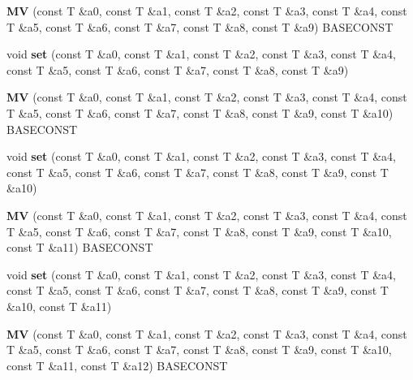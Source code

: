 \begin{DoxyCompactItemize}
\item 
\hypertarget{classvsr_1_1_m_v_a33e1f0de34216066d90ba01eb4285ca2}{{\bfseries M\-V} (const T \&a0, const T \&a1, const T \&a2, const T \&a3, const T \&a4, const T \&a5, const T \&a6, const T \&a7, const T \&a8, const T \&a9) B\-A\-S\-E\-C\-O\-N\-S\-T}\label{classvsr_1_1_m_v_a33e1f0de34216066d90ba01eb4285ca2}

\item 
\hypertarget{classvsr_1_1_m_v_a4fd8f142a49e1610870d72131c5ae9ea}{void {\bfseries set} (const T \&a0, const T \&a1, const T \&a2, const T \&a3, const T \&a4, const T \&a5, const T \&a6, const T \&a7, const T \&a8, const T \&a9)}\label{classvsr_1_1_m_v_a4fd8f142a49e1610870d72131c5ae9ea}

\item 
\hypertarget{classvsr_1_1_m_v_a354ea82b09fb50715220e42b528440f9}{{\bfseries M\-V} (const T \&a0, const T \&a1, const T \&a2, const T \&a3, const T \&a4, const T \&a5, const T \&a6, const T \&a7, const T \&a8, const T \&a9, const T \&a10) B\-A\-S\-E\-C\-O\-N\-S\-T}\label{classvsr_1_1_m_v_a354ea82b09fb50715220e42b528440f9}

\item 
\hypertarget{classvsr_1_1_m_v_a1528c747339690b289dcb4c040e80956}{void {\bfseries set} (const T \&a0, const T \&a1, const T \&a2, const T \&a3, const T \&a4, const T \&a5, const T \&a6, const T \&a7, const T \&a8, const T \&a9, const T \&a10)}\label{classvsr_1_1_m_v_a1528c747339690b289dcb4c040e80956}

\item 
\hypertarget{classvsr_1_1_m_v_a51d7eb5f026fa176c0b6cd35a2a185c9}{{\bfseries M\-V} (const T \&a0, const T \&a1, const T \&a2, const T \&a3, const T \&a4, const T \&a5, const T \&a6, const T \&a7, const T \&a8, const T \&a9, const T \&a10, const T \&a11) B\-A\-S\-E\-C\-O\-N\-S\-T}\label{classvsr_1_1_m_v_a51d7eb5f026fa176c0b6cd35a2a185c9}

\item 
\hypertarget{classvsr_1_1_m_v_aa1b648ccc309235e59288cae2394eea3}{void {\bfseries set} (const T \&a0, const T \&a1, const T \&a2, const T \&a3, const T \&a4, const T \&a5, const T \&a6, const T \&a7, const T \&a8, const T \&a9, const T \&a10, const T \&a11)}\label{classvsr_1_1_m_v_aa1b648ccc309235e59288cae2394eea3}

\item 
\hypertarget{classvsr_1_1_m_v_ac2388baf84fbed733a9ff6bc8ffca201}{{\bfseries M\-V} (const T \&a0, const T \&a1, const T \&a2, const T \&a3, const T \&a4, const T \&a5, const T \&a6, const T \&a7, const T \&a8, const T \&a9, const T \&a10, const T \&a11, const T \&a12) B\-A\-S\-E\-C\-O\-N\-S\-T}\label{classvsr_1_1_m_v_ac2388baf84fbed733a9ff6bc8ffca201}


\end{DoxyCompactItemize}
